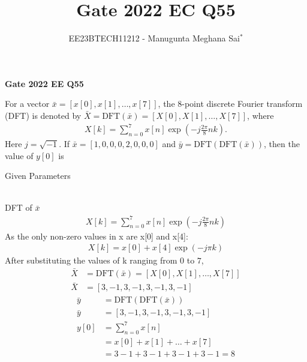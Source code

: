 \documentclass[journal,12pt,onecolumn]{IEEEtran}
\theoremstyle{remark}
\begin{document}
    
    
    \vspace{3cm}
    
    \title{Gate 2022 EC Q55}
    \author{EE23BTECH11212 - Manugunta Meghana Sai$^{*}$%
    }
    \maketitle
    \bigskip
    
    \renewcommand{\thefigure}{\theenumi}
    \renewcommand{\thetable}{\theenumi}
    
    \vspace{3cm}
    \textbf{Gate 2022 EE Q55} 
    
    For a vector $\bar{x} = [x[0], x[1], \dots, x[7] ]$, the $8$-point discrete Fourier transform (DFT) is denoted by $\bar{X} = \text{DFT}(\bar{x}) = [X[0],X[1],\dots,X[7]]$, where
    \begin{align*}
    X[k] = \sum_{n=0}^{7}x[n]\exp\left(-j\frac{2\pi}{8}nk\right).
    \end{align*} 
    Here $j = \sqrt{-1}$. If $\bar{x} = [1,0,0,0,2,0,0,0]$ and $\bar{y} = \text{DFT}(\text{DFT}(\bar{x}))$, then the value of $y[0]$ is\\
    \solution
    \fi
    \begin{table}[h!]
 	\centering
 	\resizebox{6 cm}{!}{
 		
 	}
 	\caption{Given Parameters}
 	\label{tab:msmECgate55tab1} 
 \end{table} 
    \\DFT of $\bar{x}$
    \begin{align}
    X[k] = \sum_{n=0}^{7}x[n]\exp\left(-j\frac{2\pi}{8}nk\right)
    \end{align}
    As the only non-zero values in x are x[0] and x[4]:
    \begin{align}
    X[k] = x[0] + x[4]\exp\left(-j\pi k\right)
    \end{align}
    After substituting the values of k ranging from $0$ to $7$,
    \begin{align}
    \bar{X} &= \text{DFT}(\bar{x}) = [X[0],X[1],\dots,X[7]]\\
    \bar{X} &= [3,-1,3,-1,3,-1,3,-1]
    \end{align}
    \begin{align}
    \bar{y} &= \text{DFT}(\text{DFT}(\bar{x}))\\
    \bar{y} &= [3,-1,3,-1,3,-1,3,-1]\\
    y[0] &= \sum_{n=0}^{7}x[n]\\
    &= x[0] + x[1] + \dots + x[7]\\
    &= 3 -1 +3 -1 +3 -1 +3 -1 = 8
    \end{align}
\end{document}
